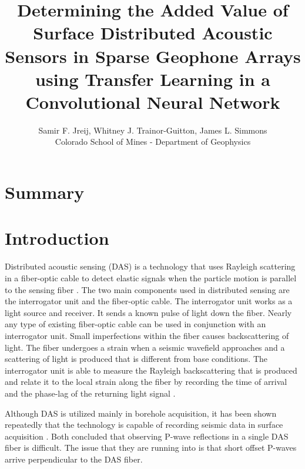 

\title{Determining the Added Value of Surface Distributed Acoustic Sensors in Sparse Geophone Arrays using Transfer Learning in a Convolutional Neural Network}
\author{Samir F. Jreij, Whitney J. Trainor-Guitton, James L. Simmons \\Colorado School of Mines - Department of Geophysics}

\maketitle

\section{Summary}

\section{Introduction}
Distributed acoustic sensing (DAS) is a technology that uses Rayleigh scattering in a fiber-optic cable to detect elastic signals when the particle motion is parallel to the sensing fiber \citep{hornman2013field}. The two main components used in distributed sensing are the interrogator unit and the fiber-optic cable. The interrogator unit works as a light source and receiver. It sends a known pulse of light down the fiber. Nearly any type of existing fiber-optic cable can be used in conjunction with an interrogator unit. Small imperfections within the fiber causes backscattering of light. The fiber undergoes a strain when a seismic wavefield approaches and a scattering of light is produced that is different from base conditions. The interrogator unit is able to measure the Rayleigh backscattering that is produced and relate it to the local strain along the fiber by recording the time of arrival and the phase-lag of the returning light signal \citep{Parker2014}.

Although DAS is utilized mainly in borehole acquisition, it has been shown repeatedly that the technology is capable of recording seismic data in surface acquisition \citep{daley2013field,yavuz2016subsurface,jreij2018improving}. Both \citet{daley2013field,yavus2016subsurface} concluded that observing P-wave reflections in a single DAS fiber is difficult. The issue that they are running into is that short offset P-waves arrive perpendicular to the DAS fiber. 

